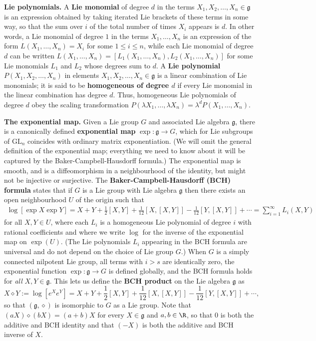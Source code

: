 \medskip

\textbf{Lie polynomials.} 
A \textbf{Lie monomial} of degree $d$ in the terms $X_1, X_2, \ldots, X_n \in \mathfrak{g}$ is an expression obtained by taking iterated Lie brackets of these terms in some way, so that the sum over $i$ of the total number of times $X_i$ appears is $d$. In other words, a Lie monomial of degree $1$ in the terms $X_1,\ldots,X_n$ is an expression of the form $L(X_1,\ldots,X_n)=X_i$ for some $1\leq i \leq n$, while each Lie monomial of degree $d$ can be written $L(X_1,\ldots,X_n)=[L_1(X_1,\ldots,X_n),L_2(X_1,\ldots,X_n)]$ for some Lie monomials $L_1$ and $L_2$ whose degrees sum to $d$. 
A \textbf{Lie polynomial} $P(X_1, X_2, \ldots, X_n)$ in elements $X_1, X_2, \ldots, X_n \in \mathfrak{g}$ is a linear combination of Lie monomials; it is said to be \textbf{homogeneous of degree $d$} if every Lie monomial in the linear combination has degree $d$. Thus, homogeneous Lie polynomials of degree $d$ obey the scaling transformation $P(\lambda X_1,\ldots, \lambda X_n)=\lambda^d P(X_1,\ldots, X_n)$. 

\medskip

\textbf{The exponential map.} Given a Lie group $G$ and associated Lie algebra $\mathfrak{g}$, there is a canonically defined \textbf{exponential map} $\exp:\mathfrak{g}\to G$, which for Lie subgroups of $\mathrm{GL}_n$ coincides with ordinary matrix exponentiation. (We will omit the general definition of the exponential map; everything we need to know about it will be captured by the Baker-Campbell-Hausdorff formula.) The exponential map is smooth, and is a diffeomorphism in a neighbourhood of the identity, but might not be injective or surjective.
The \textbf{Baker-Campbell-Hausdorff (BCH) formula} \cite[Chapter 1.2.5]{MR3237440} states that if $G$ is a Lie group with Lie algebra $\mathfrak{g}$ then there exists an open neighbourhood $U$ of the origin such that
\begin{align*}
\log \left[\exp X \exp Y\right] = X + Y + \frac{1}{2}[X,Y]+\frac{1}{12}[X,[X,Y]]-\frac{1}{12}[Y,[X,Y]]+\cdots
= \sum_{i=1}^\infty L_i(X,Y)
\end{align*}
for all $X,Y \in U$, where each $L_i$ is a homogeneous Lie polynomial of degree $i$ with rational coefficients and where we write $\log$ for the inverse of the exponential map on $\exp(U)$. (The Lie polynomials $L_i$ appearing in the BCH formula are universal and do not depend on the choice of Lie group $G$.) When $G$ is a simply connected nilpotent Lie group, all terms with $i>s$ are identically zero, the exponential function $\exp:\mathfrak{g}\to G$ is defined globally, and the BCH formula holds for \emph{all} $X,Y \in\mathfrak{g}$.
This lets us define the \textbf{BCH product} on the Lie algebra $\mathfrak{g}$ as
\[X\diamond Y := \log \left[e^Xe^Y\right]  = X + Y + \frac{1}{2}[X,Y]+\frac{1}{12}[X,[X,Y]]-\frac{1}{12}[Y,[X,Y]]+\cdots,
\]
so that $(\mathfrak{g},\diamond)$ is isomorphic to $G$ as a Lie group. Note that $(aX) \diamond (bX)=(a+b)X$ for every $X \in \mathfrak{g}$ and $a,b\in \R$, so that $0$ is both the additive and BCH identity and that $(-X)$ is both the additive and BCH inverse of $X$.




